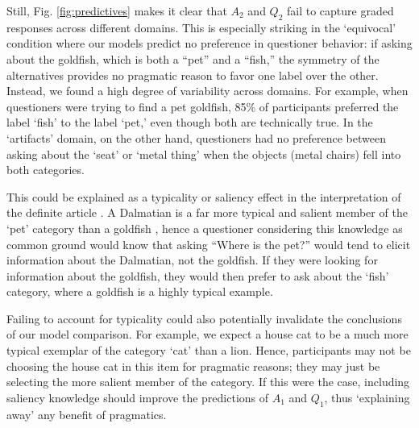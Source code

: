 \documentclass[12pt, floatsintext, jou]{apa6}
\begin{document}
Still, Fig. \ref{fig:predictives} makes it clear that $A_2$ and $Q_2$ fail to capture graded responses across different domains. This is especially striking in the `equivocal' condition where our models predict no preference in questioner behavior: if asking about the goldfish, which is both a ``pet'' and a ``fish,'' the symmetry of the alternatives provides no pragmatic reason to favor one label over the other. Instead, we found a high degree of variability across domains. For example, when questioners were trying to find a pet goldfish, 85\% of participants preferred the label `fish' to the label `pet,' even though both are technically true. In the `artifacts' domain, on the other hand, questioners had no preference between asking about the `seat' or `metal thing' when the objects (metal chairs) fell into both categories.


This could be explained as a typicality or saliency effect in the interpretation of the definite article \cite{Strawson50_OnReferring, ClarkSchreuderButtrick83_CommonGroundUnderstanding}. A Dalmatian is a far more typical and salient member of the `pet' category than a goldfish \cite{Rosch75}, hence a questioner considering this knowledge as common ground would know that asking ``Where is the pet?'' would tend to elicit information about the Dalmatian, not the goldfish. If they were looking for information about the goldfish, they would then prefer to ask about the `fish' category, where a goldfish is a highly typical example. 

Failing to account for typicality could also potentially invalidate the conclusions of our model comparison. For example, we expect a house cat to be a much more typical exemplar of the category `cat' than a lion. Hence, participants may not be choosing the house cat in this item for pragmatic reasons; they may just be selecting the more salient member of the category. If this were the case, including saliency knowledge should improve the predictions of $A_1$ and $Q_1$, thus `explaining away' any benefit of pragmatics. 

\end{document}
